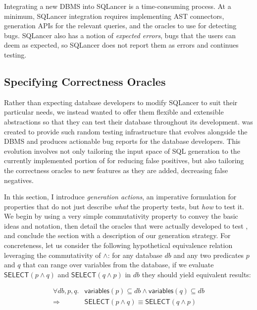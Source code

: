 Integrating a new DBMS into SQLancer is a time-consuming process. At a minimum,
SQLancer integration requires implementing AST connectors, generation APIs for the
relevant queries, and the oracles to use for detecting bugs. SQLancer also has a notion
of \emph{expected errors}, bugs that the users can deem as expected, so SQLancer does
not report them as errors and continues testing.

\subsection{Specifying Correctness Oracles} \label{dirt:sec:correctness}

Rather than expecting database developers to modify SQLancer to suit their particular
needs, we instead wanted to offer them flexible and extensible abstractions so that
they can test their database throughout its development. \tool{} was created to provide
such random testing infrastructure that evolves alongside the DBMS and produces
actionable bug reports for the database developers. This evolution involves not only
tailoring the input space of SQL generation to the currently implemented portion of
\db{} for reducing false positives, but also tailoring the correctness oracles to new
features as they are added, decreasing false negatives.

In this section, I introduce {\em generation actions}, an imperative formulation for
properties that do not just describe \emph{what} the property tests, but \emph{how} to
test it. We begin by using a very simple commutativity property to convey the basic
ideas and notation, then detail the oracles that were actually developed to test \db{},
and conclude the section with a description of our generation strategy. For
concreteness, let us consider the following hypothetical equivalence relation
leveraging the commutativity of $\land$: for any database $\mathit{db}$ and any two
predicates $p$ and $q$ that can range over variables from the database, if we evaluate
\(\mathsf{SELECT}(p \land q)\) and \(\mathsf{SELECT}(q \land p)\) in $\mathit{db}$
they should yield equivalent results:

\[
  \begin{array}{rl}
    \forall \mathit{db}, p, q. &
      \mathsf{variables}(p) \subseteq \mathit{db}
      \land \mathsf{variables}(q) \subseteq \mathit{db} \\
    \Rightarrow       &
      \mathsf{SELECT}(p \land q) \equiv \mathsf{SELECT}(q \land p)
  \end{array}
\]

